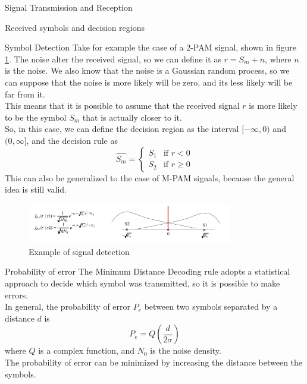 \begin{section}{Signal Transmission and Reception}
\begin{subsection}{Received symbols and decision regions}
\begin{subsubsection}{Symbol Detection}
      Take for example the case of a 2-PAM signal, shown in figure \ref{fig:signal detection example}.
      The noise alter the received signal, so we can define it as $r=S_m+n$, where $n$ is the noise.
      We also know that the noise is a Gaussian random process, so we can suppose that the noise is
      more likely will be zero, and its less likely will be far from it.\\
      This means that it is possible to assume that the received signal $r$ is more likely to be the
      symbol $S_m$ that is actually closer to it.\\
      So, in this case, we can define the decision region as the interval $[-\infty,0)$ and $(0,\infty]$,
      and the decision rule as
      \begin{equation}
        \hat{S_m}=\begin{cases}
          S_1 & \text{if } r<0\\
          S_2 & \text{if } r\geq 0
        \end{cases}
      \end{equation}
      This can also be generalized to the case of M-PAM signals, because the general idea is still valid.
      \begin{figure}[h]
        \centering
        \includegraphics[width=0.8\textwidth]{img/wireless/signal detection example.png}
        \caption{Example of signal detection}
        \label{fig:signal detection example}
      \end{figure}
    \end{subsubsection}
    \begin{subsubsection}{Probability of error}
      The Minimum Distance Decoding rule adopts a statistical approach to decide which symbol was
      transmitted, so it is possible to make errors.\\
      In general, the probability of error $P_e$ between two symbols separated by a distance $d$ is
      \begin{equation}
        P_e=Q\left(\frac{d}{2\sigma}\right)
      \end{equation}
      where $Q$ is a complex function, and $N_0$ is the noise density.\\
      The probability of error can be minimized by increasing the distance between the symbols.


\end{subsubsection}
\end{subsection}
\end{section}
